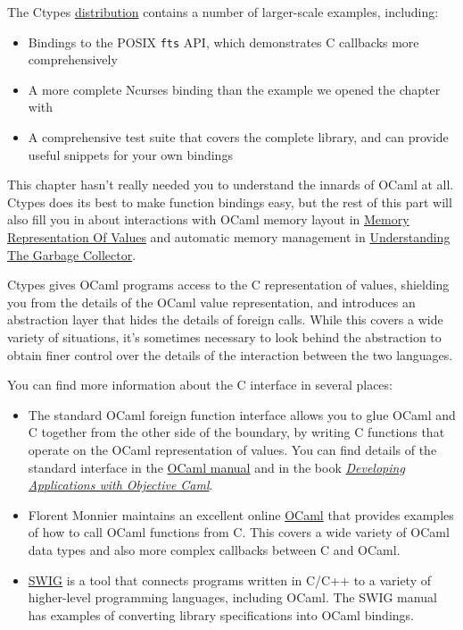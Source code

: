 The Ctypes \href{http://github.com/ocamllabs/ocaml-ctypes}{distribution}
contains a number of larger-scale examples, including:

\begin{itemize}
\item
  Bindings to the POSIX \passthrough{\lstinline!fts!} API, which
  demonstrates C callbacks more comprehensively
\item
  A more complete Ncurses binding than the example we opened the chapter
  with
\item
  A comprehensive test suite that covers the complete library, and can
  provide useful snippets for your own bindings
\end{itemize}

This chapter hasn't really needed you to understand the innards of OCaml
at all. Ctypes does its best to make function bindings easy, but the
rest of this part will also fill you in about interactions with OCaml
memory layout in
\href{runtime-memory-layout.html\#memory-representation-of-values}{Memory
Representation Of Values} and automatic memory management in
\href{garbage-collector.html\#understanding-the-garbage-collector}{Understanding
The Garbage Collector}.

Ctypes gives OCaml programs access to the C representation of values,
shielding you from the details of the OCaml value representation, and
introduces an abstraction layer that hides the details of foreign calls.
While this covers a wide variety of situations, it's sometimes necessary
to look behind the abstraction to obtain finer control over the details
of the interaction between the two languages.

You can find more information about the C interface in several places:

\begin{itemize}
\item
  The standard OCaml foreign function interface allows you to glue OCaml
  and C together from the other side of the boundary, by writing C
  functions that operate on the OCaml representation of values. You can
  find details of the standard interface in the
  \href{http://caml.inria.fr/pub/docs/manual-ocaml-4.00/manual033.html}{OCaml
  manual} and in the book
  \href{http://caml.inria.fr/pub/docs/oreilly-book/ocaml-ora-book.pdf}{\emph{Developing
  Applications with Objective Caml}}.
\item
  Florent Monnier maintains an excellent online
  \href{http://www.linux-nantes.org/~fmonnier/ocaml/ocaml-wrapping-c.html}{OCaml}
  that provides examples of how to call OCaml functions from C. This
  covers a wide variety of OCaml data types and also more complex
  callbacks between C and OCaml.
\item
  \href{http://www.swig.org}{SWIG} is a tool that connects programs
  written in C/C++ to a variety of higher-level programming languages,
  including OCaml. The SWIG manual has examples of converting library
  specifications into OCaml bindings.
\end{itemize}

